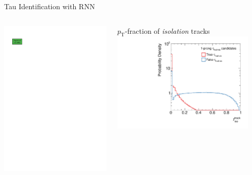\documentclass[11pt, xcolor={dvipsnames}, aspectratio=169]{beamer}
\begin{document}
\begin{frame}{Tau Identification with RNN}
  \begin{columns}[onlytextwidth]
     \centering

    \includegraphics[scale=1]{tauid/high_level_icon}


    \begin{columns}[onlytextwidth]
      \centering

      $p_{\text{T}}$-fraction of \emph{isolation} tracks\\[0.2em]

      \includegraphics[width=0.9\textwidth]{tauid/invars/invars_sumpttrkfrac_1P}


\end{columns}
\end{columns}
\end{frame}
\end{document}
